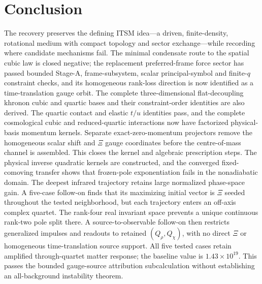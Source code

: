 ﻿\documentclass[11pt]{article}
\begin{document}
\tableofcontents












\section*{Conclusion}

The recovery preserves the defining ITSM idea---a driven, finite-density,
rotational medium with compact topology and sector exchange---while recording
where candidate mechanisms fail.  The minimal condensate route to the spatial
cubic law is closed negative; the replacement preferred-frame force sector has
passed bounded Stage-A, frame-subsystem, scalar principal-symbol and finite-$q$
constraint checks, and its homogeneous rank-loss direction is now identified
as a time-translation gauge orbit.  The complete three-dimensional
flat-decoupling khronon cubic and quartic bases and their constraint-order
identities are also derived.  The quartic contact and elastic $t/u$ identities
pass, and the complete cosmological cubic and reduced-quartic interactions
now have factorized
physical-basis momentum kernels.  Separate exact-zero-momentum projectors
remove the homogeneous scalar shift and $\Xi$ gauge coordinates before the
centre-of-mass channel is assembled.  This closes the kernel and algebraic
prescription steps.  The physical inverse quadratic kernels are constructed,
and the converged fixed-comoving transfer shows that frozen-pole exponentiation
fails in the nonadiabatic domain.  The deepest infrared trajectory retains
large normalized phase-space gain.  A five-case follow-on finds that its
maximizing initial vector is $\Xi$ seeded throughout the tested neighborhood,
but each trajectory enters an off-axis complex quartet.  The rank-four real
invariant space prevents a unique continuous rank-two pole split there.  A
source-to-observable follow-on then restricts generalized impulses and
readouts to retained $(Q_\rho,Q_\chi)$, with no direct $\Xi$ or homogeneous
time-translation source support.  All five tested cases retain amplified
through-quartet matter response; the baseline value is
$1.43\times10^{19}$.  This passes the bounded gauge-source attribution
subcalculation without establishing an all-background instability theorem.
\end{document}
